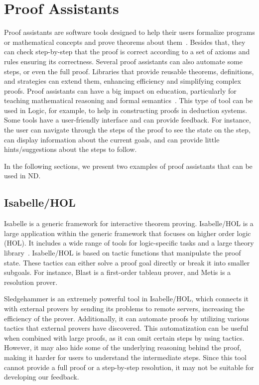 \section{Proof Assistants}
Proof assistants are software tools designed to help their users formalize programs or mathematical concepts and prove theorems about them~\cite{andersschlichtkrull_2015_formalization}. Besides that, they can check step-by-step that the proof is correct according to a set of axioms and rules ensuring its correctness. Several proof assistants can also automate some steps, or even the full proof. Libraries that provide reusable theorems, definitions, and strategies can extend them, enhancing efficiency and simplifying complex proofs. Proof assistants can have a big impact on education, particularly for teaching mathematical reasoning and formal semantics~\cite{evmorfiairobartzia_2023_proof}. This type of tool can be used in Logic, for example, to help in constructing proofs in deduction systems. Some tools have a user-friendly interface and can provide feedback. For instance, the user can navigate through the steps of the proof to see the state on the step, can display information about the current goals, and can provide little hints/suggestions about the steps to follow.

In the following sections, we present two examples of proof assistants that can be used in \gls{ND}.

\subsection{Isabelle/HOL}
Isabelle is a generic framework for interactive theorem proving. Isabelle/HOL is a large application within the generic framework that focuses on higher order logic (HOL). It includes a wide range of tools for logic-specific tasks and a large theory library~\cite{wenzel_the,blanchette_automatic}. Isabelle/HOL is based on tactic functions that manipulate the proof state. These tactics can either solve a proof goal directly or break it into smaller subgoals. For instance, Blast is a first-order tableau prover, and Metis is a resolution prover.

Sledgehammer is an extremely powerful tool in Isabelle/HOL, which connects it with external provers by sending its problems to remote servers, increasing the efficiency of the prover. Additionally, it can automate proofs by utilizing various tactics that external provers have discovered. This automatization can be useful when combined with large proofs, as it can omit certain steps by using tactics. However, it may also hide some of the underlying reasoning behind the proof, making it harder for users to understand the intermediate steps. Since this tool cannot provide a full proof or a step-by-step resolution, it may not be suitable for developing our feedback.

